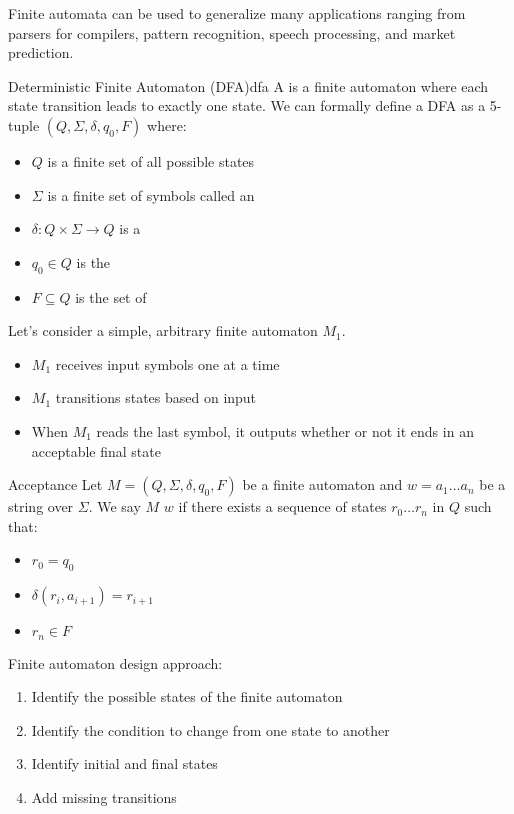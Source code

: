 \documentclass[12pt]{report}
\begin{document}
Finite automata can be used to generalize many applications ranging from parsers for compilers, pattern recognition, speech processing, and market prediction.

\begin{dfnbox}{Deterministic Finite Automaton (DFA)}{dfa}
    A  is a finite automaton where each state transition leads to exactly one state.
    \tcblower
    We can formally define a DFA as a 5-tuple $(Q, \Sigma, \delta, q_0, F)$ where:
    \begin{itemize}[noitemsep]
        \item $Q$ is a finite set of all possible states
        \item $\Sigma$ is a finite set of symbols called an 
        \item $\delta : Q \times \Sigma \to Q$ is a 
        \item $q_0 \in Q$ is the 
        \item $F \subseteq Q$ is the set of 
    \end{itemize}
\end{dfnbox}

Let's consider a simple, arbitrary finite automaton $M_1$.
\begin{itemize}
    \item $M_1$ receives input symbols one at a time
    \item $M_1$ transitions states based on input
    \item When $M_1$ reads the last symbol, it outputs whether or not it ends in an acceptable final state
\end{itemize}

\begin{dfnbox}{Acceptance}{}
    Let $M = (Q, \Sigma, \delta, q_0, F)$ be a finite automaton and $w = a_1 \ldots a_n$ be a string over $\Sigma$. We say $M$  $w$ if there exists a sequence of states $r_0 \ldots r_n$ in $Q$ such that:
    \begin{itemize}[noitemsep]
        \item $r_0 = q_0$
        \item $\delta(r_i, a_{i+1}) = r_{i+1}$
        \item $r_n \in F$
    \end{itemize}
\end{dfnbox}

Finite automaton design approach:
\begin{enumerate}
    \item Identify the possible states of the finite automaton
    \item Identify the condition to change from one state to another
    \item Identify initial and final states
    \item Add missing transitions
\end{enumerate}
\end{document}
